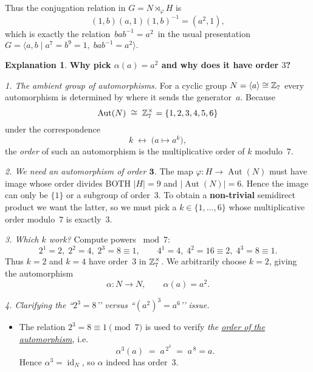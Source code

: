 \documentclass[12pt]{article}
\DeclareMathOperator{\Aut}{Aut}
\theoremstyle{definition} %
\newtheorem{explanation}{Explanation}
\theoremstyle{plain} %
\begin{document}
        Thus the conjugation relation in $G=N\rtimes_{\!\varphi}H$ is
        \[
           (1,b)(a,1)(1,b)^{-1}=(a^{2},1),
        \]
        which is exactly the relation $\,bab^{-1}=a^{2}\,$ in the usual
        presentation
        \(
           G=\langle a,b\mid a^{7}=b^{9}=1,\;bab^{-1}=a^{2}\rangle.
        \)
        \begin{explanation}
          \textbf{Why pick $\alpha(a)=a^{2}$ and why does it have order $3$?}
          
          \smallskip
          \emph{1.  The ambient group of automorphisms.}
          For a cyclic group $N=\langle a\rangle\cong\Bbb Z_{7}$ every automorphism
          is determined by where it sends the generator~$a$.
          Because
          \[
             \Aut(N)\;\cong\;\Bbb Z_{7}^{\times}
               =\{1,2,3,4,5,6\}
          \]
          under the correspondence
          \[
             k\;\longleftrightarrow\;
             \bigl(a\longmapsto a^{k}\bigr),
          \]
          the \emph{order} of such an automorphism is the multiplicative order of
          $k$ modulo~$7$.
          
          \smallskip
          \emph{2.  We need an automorphism of order \(\mathbf{3}\).}
          The map $\varphi:H\to\Aut(N)$ must have image whose order divides BOTH
          $|H|=9$ and $|\Aut(N)|=6$.
          Hence the image can only be $\{1\}$ or a subgroup of order~$3$.
          To obtain a \textbf{non-trivial} semidirect product we want the latter,
          so we must pick a $k\in\{1,\dots,6\}$ whose multiplicative order
          modulo~$7$ is exactly~$3$.
          
          \smallskip
          \emph{3.  Which $k$ work?}
          Compute powers $\bmod 7$:
          \[
             2^{1}=2,\;2^{2}=4,\;2^{3}=8\equiv1,
          \qquad
             4^{1}=4,\;4^{2}=16\equiv2,\;4^{3}=8\equiv1.
          \]
          Thus \(k=2\) and \(k=4\) have order~$3$ in $\Bbb Z_{7}^{\times}$.
          We arbitrarily choose \(k=2\), giving the automorphism
          \[
             \alpha:N\longrightarrow N,
             \qquad
             \alpha(a)=a^{2}.
          \]
          
          \smallskip
          \emph{4.  Clarifying the ``$2^{3}=8$’’ versus ``$(a^{2})^{3}=a^{6}$’’ issue.}
          
          \begin{itemize}
             \item The relation $2^{3}=8\equiv1\pmod7$ is used
                   to verify \emph{the \underline{order of the automorphism}}, i.e.
                   \[
                       \alpha^{3}(a)
                         \;=\;
                       a^{\,2^{3}}
                         \;=\;
                       a^{\,8}
                         =a.
                   \]
                   Hence \(\alpha^{3}=\operatorname{id}_{N}\), so $\alpha$ indeed has
                   order~$3$.
          

\end{itemize}
\end{explanation}
\end{document}
